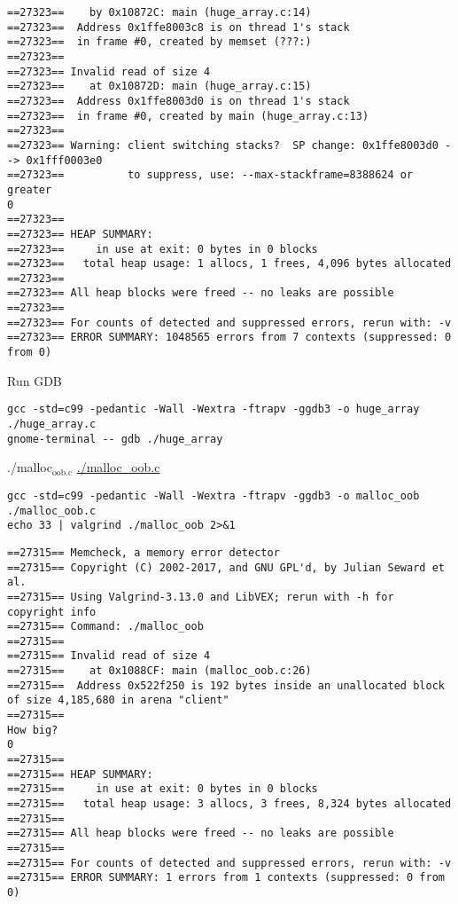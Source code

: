 \documentclass[11pt]{article}
\begin{document}
\begin{verbatim}
==27323==    by 0x10872C: main (huge_array.c:14)
==27323==  Address 0x1ffe8003c8 is on thread 1's stack
==27323==  in frame #0, created by memset (???:)
==27323== 
==27323== Invalid read of size 4
==27323==    at 0x10872D: main (huge_array.c:15)
==27323==  Address 0x1ffe8003d0 is on thread 1's stack
==27323==  in frame #0, created by main (huge_array.c:13)
==27323== 
==27323== Warning: client switching stacks?  SP change: 0x1ffe8003d0 --> 0x1fff0003e0
==27323==          to suppress, use: --max-stackframe=8388624 or greater
0
==27323== 
==27323== HEAP SUMMARY:
==27323==     in use at exit: 0 bytes in 0 blocks
==27323==   total heap usage: 1 allocs, 1 frees, 4,096 bytes allocated
==27323== 
==27323== All heap blocks were freed -- no leaks are possible
==27323== 
==27323== For counts of detected and suppressed errors, rerun with: -v
==27323== ERROR SUMMARY: 1048565 errors from 7 contexts (suppressed: 0 from 0)
\end{verbatim}

Run GDB
\begin{verbatim}
gcc -std=c99 -pedantic -Wall -Wextra -ftrapv -ggdb3 -o huge_array ./huge_array.c
gnome-terminal -- gdb ./huge_array
\end{verbatim}

\item ./malloc\(_{\text{oob.c}}\)
\label{sec:org49dd09a}
\url{./malloc\_oob.c}

\begin{verbatim}
gcc -std=c99 -pedantic -Wall -Wextra -ftrapv -ggdb3 -o malloc_oob ./malloc_oob.c
echo 33 | valgrind ./malloc_oob 2>&1
\end{verbatim}

\begin{verbatim}
==27315== Memcheck, a memory error detector
==27315== Copyright (C) 2002-2017, and GNU GPL'd, by Julian Seward et al.
==27315== Using Valgrind-3.13.0 and LibVEX; rerun with -h for copyright info
==27315== Command: ./malloc_oob
==27315== 
==27315== Invalid read of size 4
==27315==    at 0x1088CF: main (malloc_oob.c:26)
==27315==  Address 0x522f250 is 192 bytes inside an unallocated block of size 4,185,680 in arena "client"
==27315== 
How big?
0
==27315== 
==27315== HEAP SUMMARY:
==27315==     in use at exit: 0 bytes in 0 blocks
==27315==   total heap usage: 3 allocs, 3 frees, 8,324 bytes allocated
==27315== 
==27315== All heap blocks were freed -- no leaks are possible
==27315== 
==27315== For counts of detected and suppressed errors, rerun with: -v
==27315== ERROR SUMMARY: 1 errors from 1 contexts (suppressed: 0 from 0)
\end{verbatim}
\end{document}
